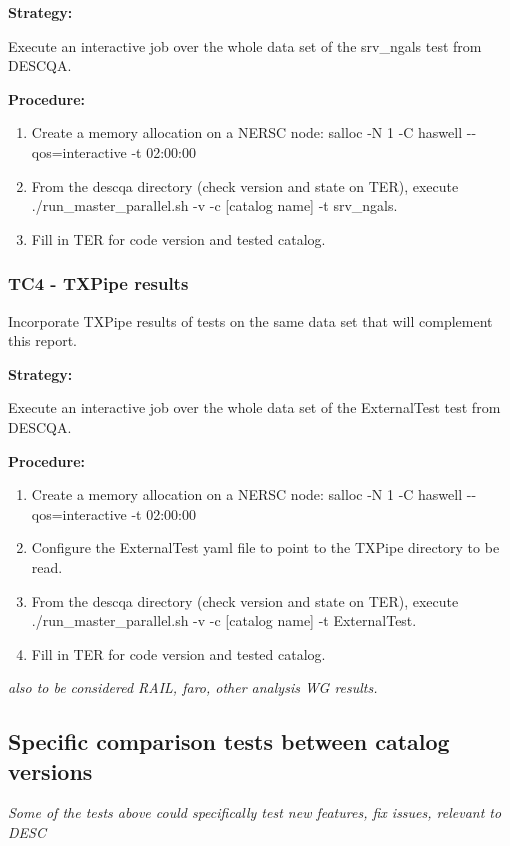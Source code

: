 \documentclass[11pt, a4paper]{article}
\begin{document}
\textbf{Strategy:} 

Execute an interactive job over the whole data set of the srv\_ngals test from DESCQA. 

\textbf{Procedure:} 

\begin{enumerate}
	\item Create a memory allocation on a NERSC node: salloc -N 1 -C haswell -{}-qos=interactive -t 02:00:00
	\item From the descqa directory (check version and state on TER), execute ./run\_master\_parallel.sh -v -c [catalog name] -t srv\_ngals. 
	\item Fill in TER for code version and tested catalog.
\end{enumerate}

\subsubsection{TC4 - TXPipe results}
Incorporate TXPipe results of tests on the same data set that will complement this report.

\textbf{Strategy:} 

Execute an interactive job over the whole data set of the ExternalTest test from DESCQA. 

\textbf{Procedure:} 

\begin{enumerate}
	\item Create a memory allocation on a NERSC node: salloc -N 1 -C haswell -{}-qos=interactive -t 02:00:00
	\item Configure the ExternalTest yaml file to point to the TXPipe directory to be read.
	\item From the descqa directory (check version and state on TER), execute ./run\_master\_parallel.sh -v -c [catalog name] -t ExternalTest. 
	\item Fill in TER for code version and tested catalog.
\end{enumerate}

\textit{also to be considered RAIL, faro, other analysis WG results.}

\subsection{Specific comparison tests between catalog versions}

\textit{Some of the tests above could specifically test new features, fix issues, relevant to DESC}
\end{document}
